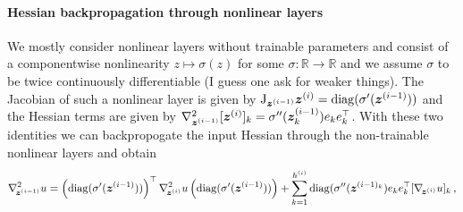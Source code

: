 \paragraph{Hessian backpropagation through nonlinear layers}
We mostly consider nonlinear layers without trainable parameters and consist of a componentwise nonlinearity $z\mapsto \sigma(z)$ for some $\sigma\colon\mathbb R\to\mathbb R$ and we assume $\sigma$ to be twice continuously differentiable (I guess one ask for weaker things).
The Jacobian of such a nonlinear layer is given by
  $\mathrm{J}_{{\bm{z}}^{(i-1)}}{\bm{z}}^{(i)} = \operatorname{diag}(\sigma'({\bm{z}}^{(i-1)}))$
and the %
Hessian terms are given by
  $\nabla^2_{{\bm{z}}^{(i-1)}}[{\bm{z}}^{(i)}]_k = \sigma''({\bm{z}}^{(i-1)}_k) e_k  e_k^\top$. 
With these two identities we can backpropogate the input Hessian through the non-trainable nonlinear layers and obtain
\begin{equation}
  \nabla_{\!{{\bm{z}}^{(i-1)}}}^{2}u
  =
  \left( \operatorname{diag}(\sigma'({\bm{z}}^{(i-1)})) \right)^{\top}
  \nabla_{\!{{\bm{z}}^{(i)}}}^{2}u
  \left( \operatorname{diag}(\sigma'({\bm{z}}^{(i-1)})) \right)
  +
  \sum_{k=1}^{h^{(i)}}
  \operatorname{diag}(\sigma''({\bm{z}}^{(i-1)_k})
  e_k e_k^\top
  [\nabla_{\!{{\bm{z}}^{(i)}}} u]_k\,,
\end{equation}

